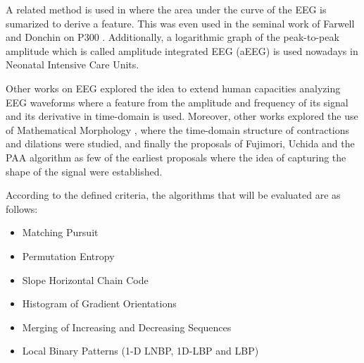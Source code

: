 \documentclass[sensors,article,submit,moreauthors,pdftex,10pt,a4paper]{mdpi}
\begin{document}
A related method is used in \citep{Alvarado-Gonzalez2016} where the area under the curve of the EEG is sumarized to derive a feature.  This was even used in the seminal work of Farwell and Donchin on P300 \citep{Farwell1988,WolpawJonathanR2012}. Additionally, a logarithmic graph of the peak-to-peak amplitude which is called amplitude integrated EEG (aEEG) \citep{Shah2015} is used nowadays in Neonatal Intensive Care Units.

Other works on EEG explored the idea to extend human capacities analyzing EEG waveforms \citep{Klein1976} where a feature from the amplitude and frequency of its signal and its derivative in time-domain is used.  Moreover, other works explored the use of Mathematical Morphology \citep{Yamaguchi2009}, where the time-domain structure of contractions and dilations were studied, and finally the proposals of Fujimori, Uchida and the PAA algorithm as few of the earliest proposals where the idea of capturing the shape of the signal were established.



%
%
%
%
%
%
%
%
%
%

According to the defined criteria, the algorithms that will be evaluated are as follows:

\begin{itemize}
\item Matching Pursuit
\item Permutation Entropy
\item Slope Horizontal Chain Code
\item Histogram of Gradient Orientations
 \item Merging of Increasing and Decreasing Sequences
\item Local Binary Patterns (1-D LNBP, 1D-LBP and LBP)
\end{itemize}
\end{document}
